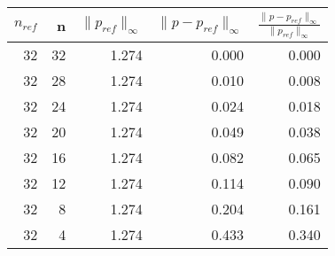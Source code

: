 \begin{tabular}{rrrrr}
\toprule
$n_{ref}$ & n & $\| p_{ref} \|_{\infty}$ & $\| p-p_{ref} \|_{\infty}$ & $\frac{\| p-p_{ref} \|_{\infty}}{\| p_{ref} \|_{\infty}}$ \\
\midrule
32 & 32 & 1.274 & 0.000 & 0.000 \\
32 & 28 & 1.274 & 0.010 & 0.008 \\
32 & 24 & 1.274 & 0.024 & 0.018 \\
32 & 20 & 1.274 & 0.049 & 0.038 \\
32 & 16 & 1.274 & 0.082 & 0.065 \\
32 & 12 & 1.274 & 0.114 & 0.090 \\
32 & 8 & 1.274 & 0.204 & 0.161 \\
32 & 4 & 1.274 & 0.433 & 0.340 \\
\bottomrule
\end{tabular}
